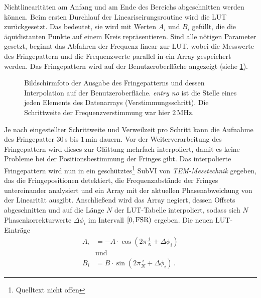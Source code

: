 Nichtlinearitäten am Anfang und am Ende des Bereichs abgeschnitten werden
können. Beim ersten Durchlauf der Lineariseirungsroutine wird die LUT
zurückgesetzt. Das bedeutet, sie wird mit Werten $A_i$ und $B_i$ gefüllt, die
die äquidistanten Punkte auf einem Kreis repräsentieren. Sind alle nötigen
Parameter gesetzt, beginnt das Abfahren der Frequenz linear zur LUT, wobei die
Messwerte des Fringepattern und die Frequenzwerte parallel in ein Array
gespeichert werden. Das Fringepattern wird auf der
Benutzeroberfläche angezeigt (siehe
\ref{fig:linearisierung_benutzeroberflaeche_fringepattern}).\par
\begin{figure}[h]
 	\centering
	\caption[Benutzeroberfläche Linearisierung -
	Fringepattern]{Bildschirmfoto der Ausgabe des Fringepatterns und dessen
	Interpolation auf der Benutzeroberfläche. \textit{entry no} ist die Stelle
	eines jeden Elements des Datenarrays (Verstimmungsschritt). Die Schrittweite
	der Frequenzverstimmung war hier $2\,$MHz.}
	\label{fig:linearisierung_benutzeroberflaeche_fringepattern}
\end{figure}
Je nach eingestellter Schrittweite und Verweilzeit pro Schritt kann die
Aufnahme des Fringepatter $30\,$s bis $1\,$min dauern. Vor der
Weiterverarbeitung des Fringepattern wird dieses zur Glättung mehrfach interpoliert, damit es keine Probleme bei der Positionsbestimmung der Fringes
gibt. Das interpolierte Fringepattern wird nun in ein
geschütztes\footnote{Quelltext nicht offen} SubVI von \textit{TEM-Messtechnik} gegeben, das die Fringepositionen detektiert, die Frequenzabstände der Fringes
untereinander analysiert und ein Array mit der aktuellen Phasenabweichung von
der Linearität ausgibt. Anschließend wird das Array negiert, dessen Offsets
abgeschnitten und auf die Länge $N$ der LUT-Tabelle interpoliert, sodass sich
$N$ Phasenkorrekturwerte $\Delta\phi_i$ im Intervall
$[0,\text{\lstinline|FSR|})$ ergeben. Die neuen LUT-Einträge
\begin{equation}\label{eq:LUT_korrektur_01}
	\begin{split}
		A_i&=-A\cdot\cos{\left(2\pi\frac{i}{N}+\Delta\phi_i\right)}\\
		&\text{und}\\
		B_i&=B\cdot\sin{\left(2\pi\frac{i}{N}+\Delta\phi_i\right)}\,.
	\end{split}
\end{equation}
